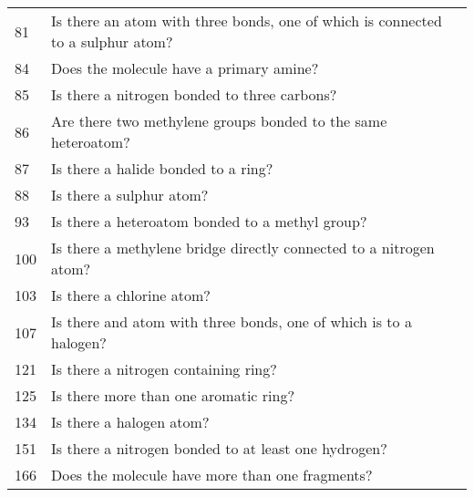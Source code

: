 \begin{tabular}{ll}
81 &  Is there an atom with three bonds, one of which is connected to a sulphur atom?   \\
84 &  Does the molecule have a primary amine?   \\
85 &  Is there a nitrogen bonded to three carbons?   \\
86 &  Are there two methylene groups bonded to the same heteroatom?   \\
87 &  Is there a halide bonded to a ring?   \\
88 &  Is there a sulphur atom?   \\
93 &  Is there a heteroatom bonded to a methyl group?   \\
100 &  Is there a methylene bridge directly connected to a nitrogen atom?   \\
103 &  Is there a chlorine atom?   \\
107 &  Is there and atom with three bonds, one of which is to a halogen?   \\
121 &  Is there a nitrogen containing ring?   \\
125 &  Is there more than one aromatic ring?   \\
134 &  Is there a halogen atom?  \\
151 &  Is there a nitrogen bonded to at least one hydrogen?   \\
166 &  Does the molecule have more than one fragments?  \\
\bottomrule
\end{tabular}
